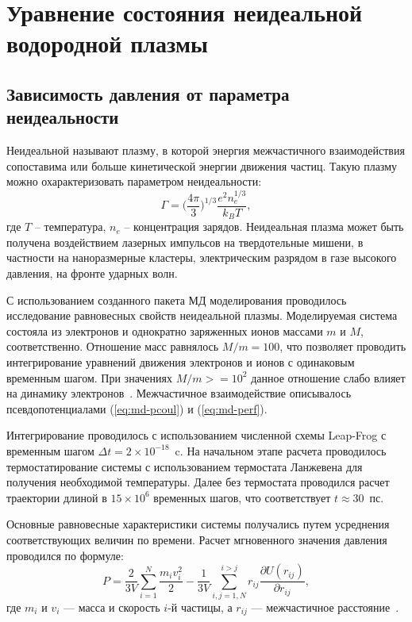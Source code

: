 \chapter{Уравнение состояния неидеальной водородной плазмы}

\section{Зависимость давления от параметра неидеальности}

Неидеальной называют плазму, в которой энергия межчастичного взаимодействия сопоставима или больше кинетической энергии движения частиц. Такую плазму можно охарактеризовать 
параметром неидеальности:
\begin{equation*}
\Gamma = \Big (\frac{4\pi}{3} \Big)^{1/3} \frac{e^2 n_e^{1/3}}{k_BT},
\end{equation*}
где $T$ -- температура, $n_e$ -- концентрация зарядов.
Неидеальная плазма может быть получена воздействием лазерных импульсов на твердотельные мишени, в частности на наноразмерные кластеры, 
электрическим разрядом в газе высокого давления, на фронте 
ударных волн.

С использованием созданного пакета МД моделирования
проводилось исследование равновесных свойств неидеальной плазмы. Моделируемая система состояла из  
электронов и однократно заряженных ионов массами $m$ и $M$, соответственно. Отношение масс равнялось $M/m = 100$, что позволяет проводить интегрирование уравнений движения
электронов и ионов с одинаковым временным шагом. При значениях $M/m >= 10^2$ данное отношение слабо влияет на динамику электронов~\cite{Morozov2005Stolknoveniya}.
Межчастичное взаимодействие описывалось псевдопотенциалами (\ref{eq:md-pcoul}) и (\ref{eq:md-perf}).

Интегрирование проводилось с использованием численной схемы Leap-Frog с временным шагом $\Delta t = 2 \times 10^{-18} $~c. На начальном этапе расчета проводилось
термостатирование системы с использованием термостата Ланжевена для получения необходимой температуры. Далее без термостата проводился расчет траектории длиной 
в $15 \times 10^6$ временных шагов, что соответствует $t \approx 30 $~пс. 

Основные равновесные характеристики системы получались путем усреднения соответствующих величин по времени. Расчет мгновенного значения давления проводился по 
формуле:
\begin{equation}\label{eq:virial}
P=\frac{2}{3V} \sum_{i = 1}^{N} \frac {m_iv_i^2}{2} - \frac{1}{3V} \sum_{i,j=1,N}^{i>j} r_{ij} \frac{\partial U(r_{ij})}{\partial r_{ij}},
\end{equation}
где $m_i$ и $v_i$ --- масса и скорость $i$-й частицы, а $r_{ij}$ --- межчастичное расстояние~\cite{allen1989computer}.

